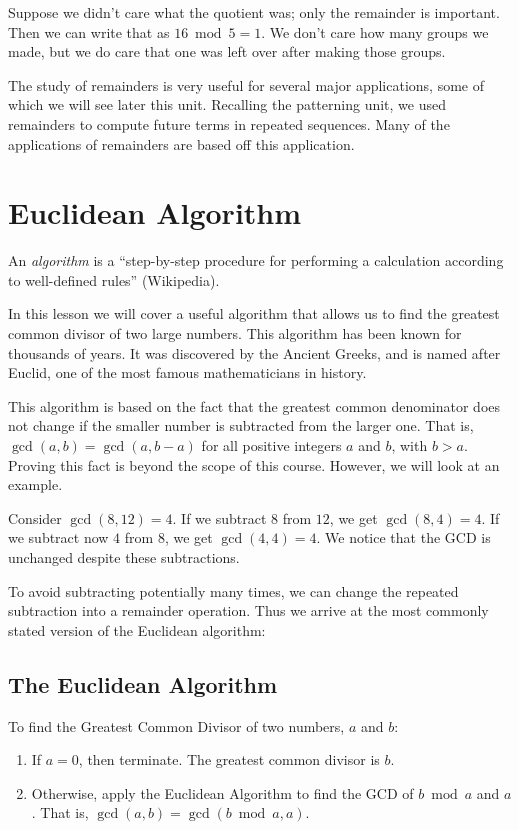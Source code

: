 \documentclass[a4paper,10pt]{report}
\begin{document}
Suppose we didn't care what the quotient was; only the remainder is important.
Then we can write that as $16 \bmod 5 = 1$. We don't care how many groups we
made, but we do care that one was left over after making those groups.

The study of remainders is very useful for several major applications, some of
which we will see later this unit. Recalling the patterning unit, we used
remainders to compute future terms in repeated sequences. Many of the
applications of remainders are based off this application.

\section{Euclidean Algorithm}
An \emph{algorithm} is a ``step-by-step procedure for performing a calculation
according to well-defined rules'' (Wikipedia).

In this lesson we will cover a useful algorithm that allows us to find the
greatest common divisor of two large numbers. This algorithm has been known for
thousands of years. It was discovered by the Ancient Greeks, and is named after
Euclid, one of the most famous mathematicians in history.

This algorithm is based on the fact that the greatest common denominator does
not change if the smaller number is subtracted from the larger one. That is,
$\gcd(a, b) = \gcd(a, b - a)$ for all positive integers $a$ and $b$, with $b>a$.
Proving this fact is beyond the scope of this course. However, we will look at
an example.

Consider $\gcd(8, 12)=4$. If we subtract $8$ from $12$, we get $\gcd(8, 4)=4$.
If we subtract now $4$ from $8$, we get $\gcd(4, 4)=4$. We notice that the GCD
is unchanged despite these subtractions.

To avoid subtracting potentially many times, we can change the repeated
subtraction into a remainder operation. Thus we arrive at the most commonly
stated version of the Euclidean algorithm:

\subsection{The Euclidean Algorithm}

To find the Greatest Common Divisor of two numbers, $a$ and $b$:
\begin{enumerate}
 \item If $a=0$, then terminate. The greatest common divisor is $b$.
 \item Otherwise, apply the Euclidean Algorithm to find the GCD of $b \bmod a$
 and $a$. That is, $\gcd(a, b) = \gcd(b \bmod a, a)$.
\end{enumerate}
\end{document}
